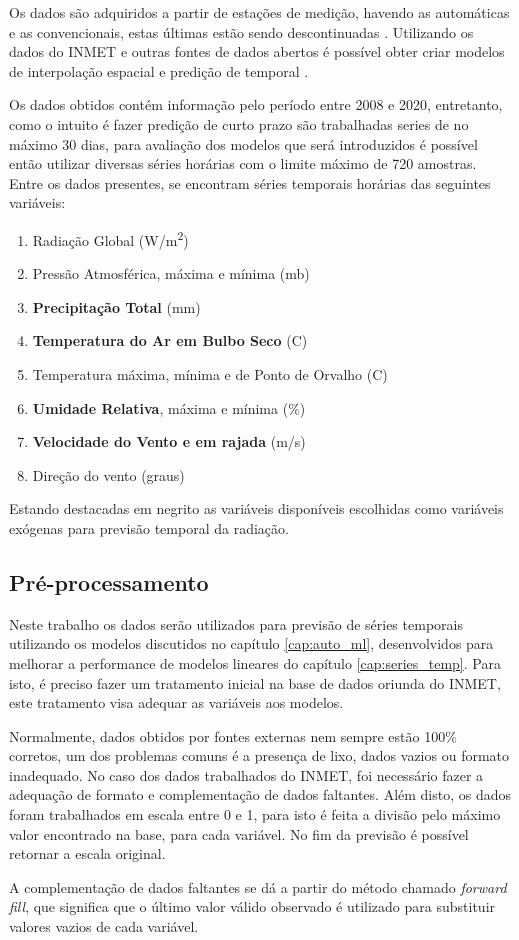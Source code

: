 Os dados são adquiridos a partir de estações de medição, havendo as automáticas e as convencionais, estas últimas estão sendo descontinuadas \cite{lima2020comparaccao}. Utilizando os dados do INMET e outras fontes de dados abertos é possível obter criar modelos de interpolação espacial e predição de temporal \cite{mendes2020integraccao}.

Os dados obtidos contém informação pelo período entre 2008 e 2020, entretanto, como o intuito é fazer predição de curto prazo são trabalhadas series de no máximo 30 dias, para avaliação dos modelos que será introduzidos é possível então utilizar diversas séries horárias com o limite máximo de 720 amostras. Entre os dados presentes, se encontram séries temporais horárias das seguintes variáveis:

\begin{enumerate}
    \item Radiação Global (W/m\textsuperscript{2})
    \item Pressão Atmosférica, máxima e mínima (mb)
    \item \textbf{Precipitação Total} (mm)
    \item \textbf{Temperatura do Ar em Bulbo Seco} (\textdegree{}C)
    \item Temperatura máxima, mínima e de Ponto de Orvalho (\textdegree{}C)
    \item \textbf{Umidade Relativa}, máxima e mínima (\%)
    \item \textbf{Velocidade do Vento e em rajada} (m/s)
    \item Direção do vento (graus)
\end{enumerate}

Estando destacadas em negrito as variáveis disponíveis escolhidas como variáveis exógenas para previsão temporal da radiação.

\subsection{Pré-processamento}

Neste trabalho os dados serão utilizados para previsão de séries temporais utilizando os modelos discutidos no capítulo \ref{cap:auto_ml}, desenvolvidos para melhorar a performance de modelos lineares do capítulo \ref{cap:series_temp}. Para isto, é preciso fazer um tratamento inicial na base de dados oriunda do INMET, este tratamento visa adequar as variáveis aos modelos. 

Normalmente, dados obtidos por fontes externas nem sempre estão 100\% corretos, um dos problemas comuns é a presença de lixo, dados vazios ou formato inadequado. No caso dos dados trabalhados do INMET, foi necessário fazer a adequação de formato e complementação de dados faltantes. Além disto, os dados foram trabalhados em escala entre 0 e 1, para isto é feita a divisão pelo máximo valor encontrado na base, para cada variável. No fim da previsão é possível retornar a escala original.

A complementação de dados faltantes se dá a partir do método chamado \textit{forward fill}, que significa que o último valor válido observado é utilizado para substituir valores vazios de cada variável.
